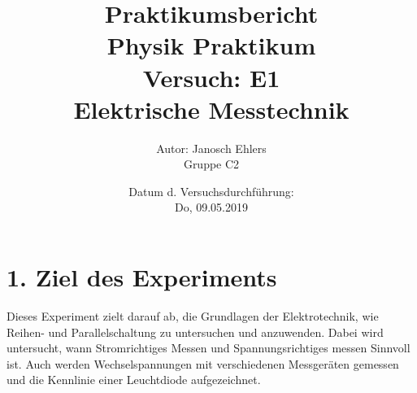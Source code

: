 \documentclass[11pt]{article}
\begin{document}
	\pagestyle{empty}
	\title{Praktikumsbericht\\Physik Praktikum\\Versuch: E1\\Elektrische Messtechnik\\}
	\author{Autor: Janosch Ehlers\\Gruppe C2}
	\date{Datum d. Versuchsdurchführung:\\Do, 09.05.2019}
	\maketitle
	\thispagestyle{empty}	
	
	\newpage
	\pagestyle{plain}
	\section*{1. Ziel des Experiments}
Dieses Experiment zielt darauf ab, die Grundlagen der Elektrotechnik, wie Reihen- und Parallelschaltung zu untersuchen und anzuwenden. Dabei wird untersucht, wann Stromrichtiges Messen und Spannungsrichtiges messen Sinnvoll ist. Auch werden Wechselspannungen mit verschiedenen Messgeräten gemessen und die Kennlinie einer Leuchtdiode aufgezeichnet.
\end{document}
